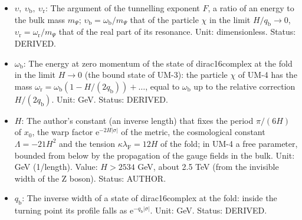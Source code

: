 \documentclass[
  10pt,
]{article}
\begin{document}
\begin{itemize}
  \(F(\upsilon)\): The tunnelling exponent of the width of the particles
  \(\chi\) per unit of \(m_\Psi/H\): the integral of the local decay
  rate \(q\) over the region inside the turning point, divided by
  \(m_\Psi/H\), as a function of the ratio \(\upsilon\) of the energy to
  the bulk mass. Unit: dimensionless. Value: 0.049 for
  \(\upsilon = 0.866\); \((q_{\mathrm{b}}/\omega_{\mathrm{b}})^3/3\) for
  weak binding. Status: DERIVED.
\item
  \(\upsilon,\ \upsilon_{\mathrm{b}},\ \upsilon_{\mathrm{r}}\): The
  argument of the tunnelling exponent \(F\), a ratio of an energy to the
  bulk mass \(m_\Psi\);
  \(\upsilon_{\mathrm{b}} = \omega_{\mathrm{b}}/m_\Psi\) that of the
  particle \(\chi\) in the limit \(H/q_{\mathrm{b}} \to 0\),
  \(\upsilon_{\mathrm{r}} = \omega_{\mathrm{r}}/m_\Psi\) that of the
  real part of its resonance. Unit: dimensionless. Status: DERIVED.
\item
  \(\omega_{\mathrm{b}}\): The energy at zero momentum of the state of
  dirac16complex at the fold in the limit \(H \to 0\) (the bound state
  of UM-3): the particle \(\chi\) of UM-4 has the mass
  \(\omega_{\mathrm{r}} = \omega_{\mathrm{b}}(1 - H/(2q_{\mathrm{b}})) + \dots\),
  equal to \(\omega_{\mathrm{b}}\) up to the relative correction
  \(H/(2q_{\mathrm{b}})\). Unit: GeV. Status: DERIVED.
\item
  \(H\): The author's constant (an inverse length) that fixes the period
  \(\pi/(6H)\) of \(x_0\), the warp factor
  \(\mathrm{e}^{-2H\lvert\sigma\rvert}\) of the metric, the cosmological
  constant \(\Lambda = -21H^2\) and the tension
  \(\kappa\lambda_{\mathrm{F}} = 12H\) of the fold; in UM-4 a free
  parameter, bounded from below by the propagation of the gauge fields
  in the bulk. Unit: GeV (1/length). Value: \(H > 2534\) GeV, about 2.5
  TeV (from the invisible width of the Z boson). Status: AUTHOR.
\item
  \(q_{\mathrm{b}}\): The inverse width of a state of dirac16complex at
  the fold: inside the turning point its profile falls as
  \(\mathrm{e}^{-q_{\mathrm{b}}\lvert\sigma\rvert}\). Unit: GeV. Status:
  DERIVED.
\end{itemize}
\end{document}
